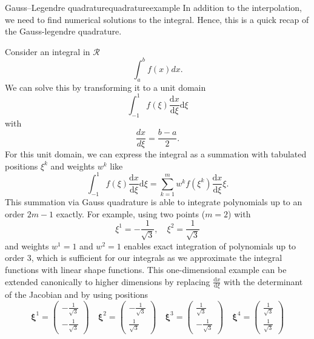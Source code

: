 \begin{example}{Gauss–Legendre quadrature}{quadratureexample} 
    In addition to the interpolation, we need to find numerical solutions to the integral. Hence, this is a quick recap of the Gauss-legendre quadrature. 
    
    Consider an integral in $\mathcal{R}$
    \begin{equation}
        \int_{a}^{b} f(x) dx.
    \end{equation}
    We can solve this by transforming it to a unit domain
    \begin{equation}
        \int_{-1}^{1} f(\xi) \frac{\text{d}x}{\text{d}\xi} \text{d}\xi
    \end{equation}
    with 
    \begin{equation}
        \frac{dx}{d\xi} = \frac{b-a}{2}.
    \end{equation}
    For this unit domain, we can express the integral as a summation with tabulated positions $\xi^k$ and weights $w^k$ like
    \begin{equation}
        \int_{-1}^{1} f(\xi) \frac{\text{d}x}{\text{d}\xi} \text{d}\xi
        = \sum_{k=1}^m w^k f(\xi^k) \frac{\text{d}x}{\text{d}\xi} \xi.
    \end{equation}
    This summation via Gauss quadrature is able to integrate polynomials up to an order $2m-1$ exactly. For example, using two points ($m=2$) with 
    \begin{equation}
        \xi^1 = -\frac{1}{\sqrt{3}}, \quad \xi^2 = \frac{1}{\sqrt{3}}
    \end{equation}
    and weights $w^1=1$ and $w^2=1$ enables exact integration of polynomials up to order 3, which is sufficient for our integrals as we approximate the integral functions with linear shape functions. This one-dimensional example can be extended canonically to higher dimensions by replacing $\frac{\text{d}x}{\text{d}\xi}$ with the determinant of the Jacobian and by using positions 
    \begin{equation}
        \pmb{\xi}^1 = \begin{pmatrix}-\frac{1}{\sqrt{3}} \\ -\frac{1}{\sqrt{3}}\end{pmatrix} 
        \quad
        \pmb{\xi}^2 = \begin{pmatrix}-\frac{1}{\sqrt{3}} \\ \frac{1}{\sqrt{3}}\end{pmatrix} 
        \quad
        \pmb{\xi}^3 = \begin{pmatrix}\frac{1}{\sqrt{3}} \\ -\frac{1}{\sqrt{3}}\end{pmatrix} 
        \quad
        \pmb{\xi}^4 = \begin{pmatrix}\frac{1}{\sqrt{3}} \\ \frac{1}{\sqrt{3}}\end{pmatrix} 
        \label{eq:gaussian_weights}
    \end{equation}
\end{example}

